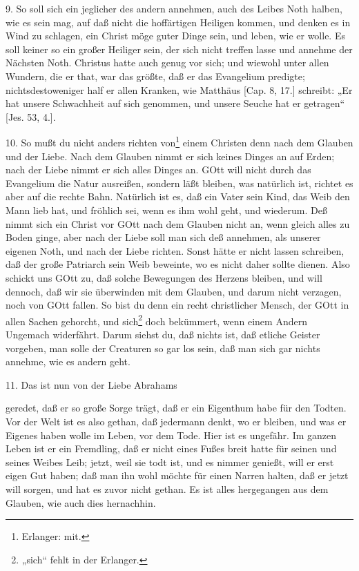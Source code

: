 9. So soll sich ein jeglicher des andern annehmen, auch des Leibes Noth halben, wie es sein mag, auf daß nicht die hoffärtigen Heiligen kommen, und denken es in Wind zu schlagen, ein Christ möge guter Dinge sein, und leben, wie er wolle. Es soll keiner so ein großer Heiliger sein, der sich nicht treffen lasse und annehme der Nächsten Noth. Christus hatte auch genug vor sich; und wiewohl unter allen Wundern, die er that, war das größte, daß er das Evangelium predigte; nichtsdestoweniger half er allen Kranken, wie Matthäus [Cap. 8, 17.] schreibt: „Er hat unsere Schwachheit auf sich genommen, und unsere Seuche hat er getragen“ [Jes. 53, 4.].

10. So mußt du nicht anders richten von\footnote{Erlanger: mit.} einem Christen denn nach dem Glauben und der Liebe. Nach dem Glauben nimmt er sich keines Dinges an auf Erden; nach der Liebe nimmt er sich alles Dinges an. GOtt will nicht durch das Evangelium die Natur ausreißen, sondern läßt bleiben, was natürlich ist, richtet es aber auf die rechte Bahn. Natürlich ist es, daß ein Vater sein Kind, das Weib den Mann lieb hat, und fröhlich sei, wenn es ihm wohl geht, und wiederum. Deß nimmt sich ein Christ vor GOtt nach dem Glauben nicht an, wenn gleich alles zu Boden ginge, aber nach der Liebe soll man sich deß annehmen, als unserer eigenen Noth, und nach der Liebe richten. Sonst hätte er nicht lassen schreiben, daß der große Patriarch sein Weib beweinte, wo es nicht daher sollte dienen. Also schickt uns GOtt zu, daß solche Bewegungen des Herzens bleiben, und will dennoch, daß wir sie überwinden mit dem Glauben, und darum nicht verzagen, noch von GOtt fallen. So bist du denn ein recht christlicher Mensch, der GOtt in allen Sachen gehorcht, und sich\footnote{„sich“ fehlt in der Erlanger.} doch bekümmert, wenn einem Andern Ungemach widerfährt. Darum siehst du, daß nichts ist, daß etliche Geister vorgeben, man solle der Creaturen so gar los sein, daß man sich gar nichts annehme, wie es andern geht.

11. Das ist nun von der Liebe Abrahams

geredet, daß er so große Sorge trägt, daß er ein Eigenthum habe für den Todten. Vor der Welt ist es also gethan, daß jedermann denkt, wo er bleiben, und was er Eigenes haben wolle im Leben, vor dem Tode. Hier ist es ungefähr. Im ganzen Leben ist er ein Fremdling, daß er nicht eines Fußes breit hatte für seinen und seines Weibes Leib; jetzt, weil sie todt ist, und es nimmer genießt, will er erst eigen Gut haben; daß man ihn wohl möchte für einen Narren halten, daß er jetzt will sorgen, und hat es zuvor nicht gethan. Es ist alles hergegangen aus dem Glauben, wie auch dies hernachhin.

